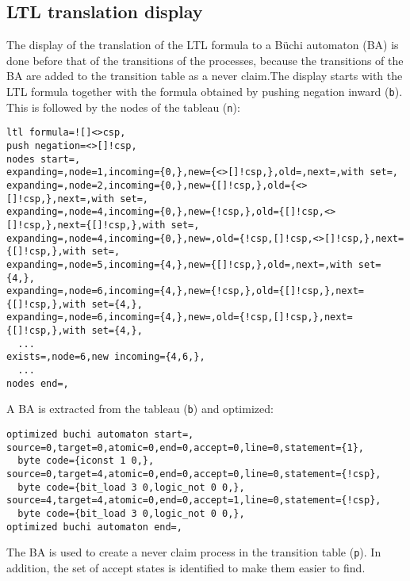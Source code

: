 \documentclass[11pt]{article}
\newcommand*{\p}[1]{\texttt{#1}}
\begin{document}
\subsection{LTL translation display}
The display of the translation of the LTL formula to a B\"{u}chi
automaton (BA) is done before that of the transitions of the processes,
because the transitions of the BA are added to the transition table as a
never claim.The display starts with the LTL formula together with the
formula obtained by pushing negation inward (\p{b}). This is followed by
the nodes of the tableau (\p{n}):

\enlargethispage{\baselineskip}

\begin{footnotesize}
\begin{verbatim}
ltl formula=![]<>csp,
push negation=<>[]!csp,
nodes start=,
expanding=,node=1,incoming={0,},new={<>[]!csp,},old=,next=,with set=,
expanding=,node=2,incoming={0,},new={[]!csp,},old={<>[]!csp,},next=,with set=,
expanding=,node=4,incoming={0,},new={!csp,},old={[]!csp,<>[]!csp,},next={[]!csp,},with set=,
expanding=,node=4,incoming={0,},new=,old={!csp,[]!csp,<>[]!csp,},next={[]!csp,},with set=,
expanding=,node=5,incoming={4,},new={[]!csp,},old=,next=,with set={4,},
expanding=,node=6,incoming={4,},new={!csp,},old={[]!csp,},next={[]!csp,},with set={4,},
expanding=,node=6,incoming={4,},new=,old={!csp,[]!csp,},next={[]!csp,},with set={4,},
  ...
exists=,node=6,new incoming={4,6,},
  ...
nodes end=,
\end{verbatim}
\end{footnotesize}

A BA is extracted from the tableau (\p{b}) and optimized:

\begin{footnotesize}
\begin{verbatim}
optimized buchi automaton start=,
source=0,target=0,atomic=0,end=0,accept=0,line=0,statement={1},
  byte code={iconst 1 0,},
source=0,target=4,atomic=0,end=0,accept=0,line=0,statement={!csp},
  byte code={bit_load 3 0,logic_not 0 0,},
source=4,target=4,atomic=0,end=0,accept=1,line=0,statement={!csp},
  byte code={bit_load 3 0,logic_not 0 0,},
optimized buchi automaton end=,
\end{verbatim}
\end{footnotesize}

The BA is used to create a never claim process in the transition table
(\p{p}). In addition, the set of accept states is identified to make
them easier to find.
\end{document}
